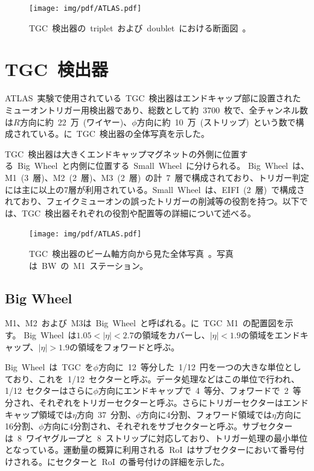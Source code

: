 \begin{figure}[H]
        \centering   
        \texttt{[image: img/pdf/ATLAS.pdf]}
        \caption[TGC~検出器の~triplet~および~doublet~における断面図]{TGC~検出器の~triplet~および~doublet~における断面図~\cite{TR:01}。}\label{fig:TGCpri}
\end{figure}

\section{TGC~検出器}
ATLAS~実験で使用されている~TGC~検出器はエンドキャップ部に設置されたミューオントリガー用検出器であり、総数として約~3700~枚で、全チャンネル数は$R$方向に約~22~万~(ワイヤー)、$\phi$方向に約~10~万~(ストリップ)~という数で構成されている。に~TGC~検出器の全体写真を示した。

TGC~検出器は大きくエンドキャップマグネットの外側に位置する~Big~Wheel~と内側に位置する~Small~Wheel~に分けられる。
Big~Wheel~は、M1~(3~層)、M2~(2~層)、M3~(2~層)~の計~7~層で構成されており、トリガー判定には主に以上の7層が利用されている。Small~Wheel~は、EIFI~(2~層)~で構成されており、フェイクミューオンの誤ったトリガーの削減等の役割を持つ。以下では、TGC~検出器それぞれの役割や配置等の詳細について述べる。

\begin{figure}[H]
    \centering   
    \texttt{[image: img/pdf/ATLAS.pdf]}
    \caption[TGC 検出器のビーム軸方向から見た全体写真]{TGC~検出器のビーム軸方向から見た全体写真~\cite{TR:01}。写真は~BW~の~M1~ステーション。}\label{fig:tgc00}
\end{figure}

\subsection{Big Wheel}
M1、M2~および~M3は~Big~Wheel~と呼ばれる。に~TGC~M1~の配置図を示す。
Big~Wheel~は$1.05<|\eta|<2.7$の領域をカバーし、$|\eta|<1.9$の領域をエンドキャップ、$|\eta|>1.9$の領域をフォワードと呼ぶ。

Big~Wheel~は~TGC~を$\phi$方向に~12~等分した~1/12~円を一つの大きな単位としており、これを~1/12~セクターと呼ぶ。データ処理などはこの単位で行われ、1/12~セクターはさらに$\phi$方向にエンドキャップで~4~等分、フォワードで~2~等分され、それぞれをトリガーセクターと呼ぶ。さらにトリガーセクターはエンドキャップ領域では$\eta$方向~37~分割、$\phi$方向に4分割、フォワード領域では$\eta$方向に16分割、$\phi$方向に4分割され、それぞれをサブセクターと呼ぶ。サブセクターは~8~ワイヤグループと~8~ストリップに対応しており、トリガー処理の最小単位となっている。運動量の概算に利用される~RoI~はサブセクターにおいて番号付けされる。にセクターと~RoI~の番号付けの詳細を示した。

